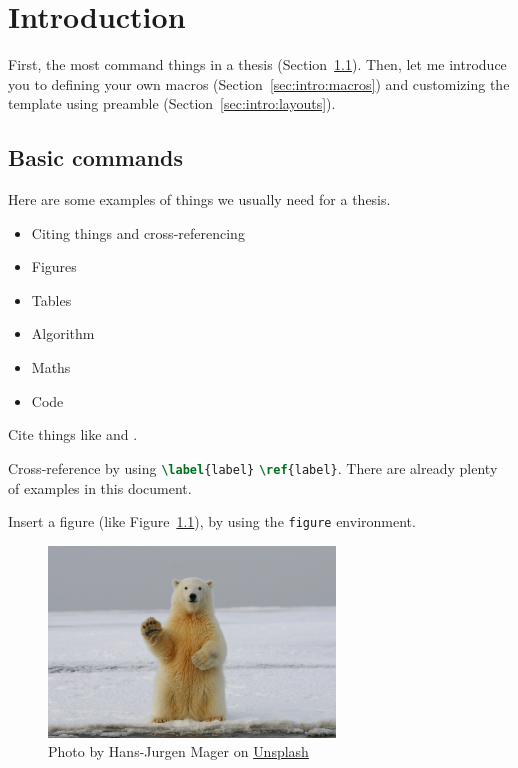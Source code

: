 \chapter{Introduction}\label{chapter:intro}
First, the most command things in a thesis (Section~\ref{sec:intro:basic-commands}).
Then, let me introduce you to defining your own macros (Section~\ref{sec:intro:macros}) and customizing the template using preamble (Section~\ref{sec:intro:layouts}).


\section{Basic commands}\label{sec:intro:basic-commands}

Here are some examples of things we usually need for a thesis.
\begin{itemize}
    \item Citing things and cross-referencing
    \item Figures
    \item Tables
    \item Algorithm
    \item Maths
    \item Code
\end{itemize}

Cite things like \citet{adrian1979ConditionalEddiesIsotropic} and \citep{agostini2020ExplorationPredictionFluid}.

Cross-reference by using \lstinline[language=tex]!\label{label}! \lstinline[language=tex]!\ref{label}!. 
There are already plenty of examples in this document.

Insert a figure (like Figure~\ref{fig:example}), by using the \lstinline[language=tex]!figure! environment.
\begin{figure}
    \centering
    \includegraphics[width=3in]{figs/example_image.jpg}
    \caption{
        Photo by Hans-Jurgen Mager on 
        \href{https://unsplash.com/photos/polar-bear-on-snow-covered-ground-during-daytime-qQWV91TTBrE?utm_content=creditCopyText&utm_medium=referral&utm_source=unsplash}{Unsplash}
    }\label{fig:example}
\end{figure}

